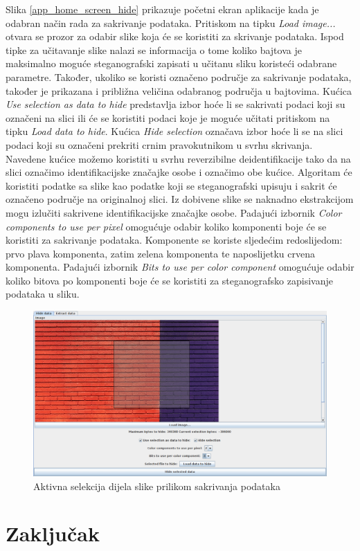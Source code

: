 \documentclass[times, utf8, seminar]{fer}
\begin{document}
Slika \ref{app_home_screen_hide} prikazuje početni ekran aplikacije kada je odabran način rada za sakrivanje podataka. Pritiskom na tipku \textit{Load image...} otvara se prozor za odabir slike koja će se koristiti za skrivanje podataka. Ispod tipke za učitavanje slike nalazi se informacija o tome koliko bajtova je maksimalno moguće steganografski zapisati u učitanu sliku koristeći odabrane parametre. Također, ukoliko se koristi označeno područje za sakrivanje podataka, također je prikazana i približna veličina odabranog područja u bajtovima. Kućica \textit{Use selection as data to hide} predstavlja izbor hoće li se sakrivati podaci koji su označeni na slici ili će se koristiti podaci koje je moguće učitati pritiskom na tipku \textit{Load data to hide}. Kućica \textit{Hide selection} označava izbor hoće li se na slici podaci koji su označeni prekriti crnim pravokutnikom u svrhu skrivanja. Navedene kućice možemo koristiti u svrhu reverzibilne deidentifikacije tako da na slici označimo identifikacijske značajke osobe i označimo obe kućice. Algoritam će koristiti podatke sa slike kao podatke koji se steganografski upisuju i sakrit će označeno područje na originalnoj slici. Iz dobivene slike se naknadno ekstrakcijom mogu izlučiti sakrivene identifikacijske značajke osobe. Padajući izbornik \textit{Color components to use per pixel} omogućuje odabir koliko komponenti boje će se koristiti za sakrivanje podataka. Komponente se koriste sljedećim redoslijedom: prvo plava komponenta, zatim zelena komponenta te naposlijetku crvena komponenta. Padajući izbornik \textit{Bits to use per color component} omogućuje odabir koliko bitova po komponenti boje će se koristiti za steganografsko zapisivanje podataka u sliku. 

\begin{figure}[ht]
\caption{Aktivna selekcija dijela slike prilikom sakrivanja podataka}
\label{app_selection_active}
\centerline{\includegraphics[scale=0.4]{images/app_selection_active.png}}
\end{figure}

\chapter{Zaključak}



\end{document}
